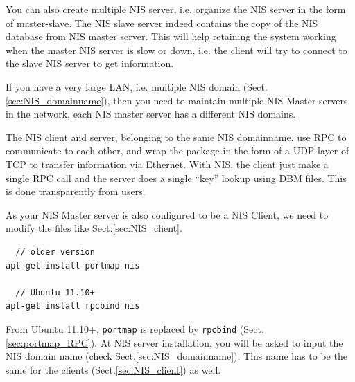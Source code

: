 You can also create multiple NIS server, i.e. organize the NIS server in the
form of master-slave. The NIS slave server indeed contains the copy of the NIS
database from NIS master server. This will help retaining the system working
when the master NIS server is slow or down, i.e. the client will try to connect
to the slave NIS server to get information.

If you have a very large LAN, i.e. multiple NIS domain
(Sect.\ref{sec:NIS_domainname}), then you need to maintain multiple NIS Master
servers in the network, each NIS master server has a different NIS domains. 

The NIS client and server, belonging to the same NIS domainname, use RPC to
communicate to each other, and wrap the package in the form of a UDP layer of
TCP to transfer information via Ethernet. With NIS, the client just make a
single RPC call and the server does a single ``key'' lookup using DBM files.
This is done transparently from users.


 
As your NIS Master server is also configured to be a NIS Client, we need to
modify the files like Sect.\ref{sec:NIS_client}.
\begin{verbatim}
  // older version
apt-get install portmap nis

  // Ubuntu 11.10+
apt-get install rpcbind nis
\end{verbatim}
From Ubuntu 11.10+, \verb!portmap! is replaced by \verb!rpcbind!
(Sect.\ref{sec:portmap_RPC}). At NIS server installation, you will be asked to
input the NIS domain name (check Sect.\ref{sec:NIS_domainname}). This name has to be
the same for the clients (Sect.\ref{sec:NIS_client}) as well.


